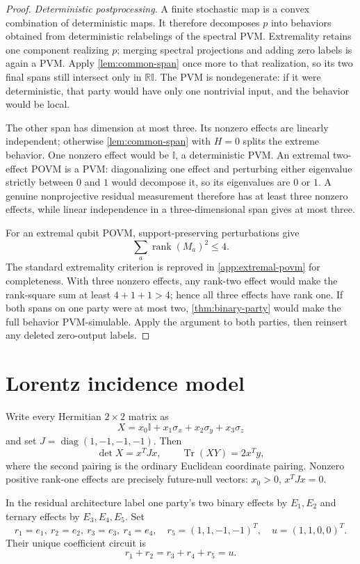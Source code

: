 \documentclass[11pt]{article}
\theoremstyle{definition}
\newcommand{\Tr}{\operatorname{Tr}}
\newcommand{\rank}{\operatorname{rank}}
\newcommand{\id}{\mathbb I}
\newcommand{\R}{\mathbb R}
\begin{document}
\begin{proof}
\emph{Deterministic postprocessing.} A finite stochastic map is a convex
combination of deterministic maps. It therefore decomposes \(p\) into
behaviors obtained from deterministic relabelings of the spectral PVM.
Extremality retains one component realizing \(p\); merging spectral
projections and adding zero labels is again a PVM. Apply
\cref{lem:common-span} once more to that realization, so its two final spans
still intersect only in \(\R\id\). The PVM is nondegenerate: if it were
deterministic, that party would have only one nontrivial input, and the
behavior would be local.

The other span has dimension at most three. Its nonzero effects are linearly
independent; otherwise \cref{lem:common-span} with \(H=0\) splits the extreme
behavior. One nonzero effect would be \(\id\), a deterministic PVM. An
extremal two-effect POVM is a PVM: diagonalizing one effect and perturbing
either eigenvalue strictly between \(0\) and \(1\) would decompose it, so its
eigenvalues are \(0\) or \(1\). A genuine nonprojective residual measurement
therefore has at least three nonzero effects, while linear independence in a
three-dimensional span gives at most three.

For an extremal qubit POVM, support-preserving perturbations give
\[
\sum_a\rank(M_a)^2\le4.
\]
The standard extremality criterion \cite{dariano2005,haapasalo2012} is
reproved in \cref{app:extremal-povm} for completeness. With three nonzero
effects, any rank-two effect would make the rank-square sum at least
\(4+1+1>4\); hence all three effects have rank one. If both spans on one party were
at most two, \cref{thm:binary-party} would make the full behavior
PVM-simulable. Apply the argument to both parties, then reinsert any deleted
zero-output labels.
\end{proof}

\section{Lorentz incidence model}
\label{sec:incidence}

Write every Hermitian \(2\times2\) matrix as
\[
X=x_0\id+x_1\sigma_x+x_2\sigma_y+x_3\sigma_z
\]
and set \(J=\operatorname{diag}(1,-1,-1,-1)\). Then
\[
\det X=x^TJx,\qquad
\Tr(XY)=2x^Ty,
\]
where the second pairing is the ordinary Euclidean coordinate pairing.
Nonzero positive rank-one effects are precisely future-null vectors:
\(x_0>0\), \(x^TJx=0\).

In the residual architecture label one party's two binary effects by
\(E_1,E_2\) and ternary effects by \(E_3,E_4,E_5\). Set
\[
r_1=e_1,\ r_2=e_2,\ r_3=e_3,\ r_4=e_4,\quad
r_5=(1,1,-1,-1)^T,\quad u=(1,1,0,0)^T.
\]
Their unique coefficient circuit is
\[
r_1+r_2=r_3+r_4+r_5=u.
\]
\end{document}
